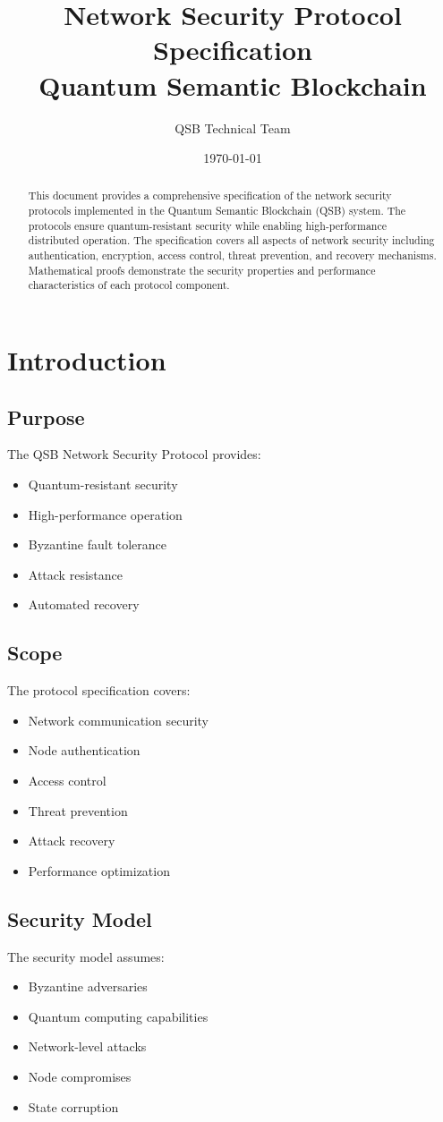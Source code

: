 \documentclass[12pt]{article}
\title{Network Security Protocol Specification\\Quantum Semantic Blockchain}
\author{QSB Technical Team}
\date{\today}
\begin{document}
\maketitle
\begin{abstract}
This document provides a comprehensive specification of the network security protocols implemented in the Quantum Semantic Blockchain (QSB) system. The protocols ensure quantum-resistant security while enabling high-performance distributed operation. The specification covers all aspects of network security including authentication, encryption, access control, threat prevention, and recovery mechanisms. Mathematical proofs demonstrate the security properties and performance characteristics of each protocol component.
\end{abstract}
\tableofcontents
\section{Introduction}
\subsection{Purpose}
The QSB Network Security Protocol provides:
\begin{itemize}
\item Quantum-resistant security
\item High-performance operation
\item Byzantine fault tolerance
\item Attack resistance
\item Automated recovery
\end{itemize}
\subsection{Scope}
The protocol specification covers:
\begin{itemize}
\item Network communication security
\item Node authentication
\item Access control
\item Threat prevention
\item Attack recovery
\item Performance optimization
\end{itemize}
\subsection{Security Model}
The security model assumes:
\begin{itemize}
\item Byzantine adversaries
\item Quantum computing capabilities
\item Network-level attacks
\item Node compromises
\item State corruption
\end{itemize}
\end{document}
